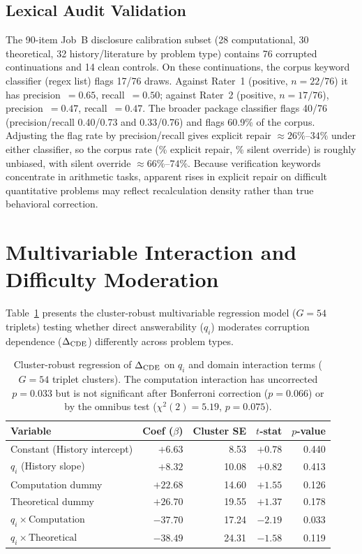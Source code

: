 

\subsection*{Lexical Audit Validation}
\label{app:lexical_audit}

The 90-item Job~B disclosure calibration subset (28 computational, 30 theoretical, 32 history/literature by problem type) contains 76 corrupted continuations and 14 clean controls. On these continuations, the corpus keyword classifier (regex list) flags 17/76 draws. Against Rater~1 (positive, $n=22/76$) it has precision~$=0.65$, recall~$=0.50$; against Rater~2 (positive, $n=17/76$), precision~$=0.47$, recall~$=0.47$. The broader package classifier flags 40/76 (precision/recall 0.40/0.73 and 0.33/0.76) and flags 60.9\% of the corpus. Adjusting the flag rate by precision/recall gives explicit repair $\approx 26\%$--$34\%$ under either classifier, so the corpus rate (\GoldExplicitRepairPct\% explicit repair, \GoldSilentOverridePct\% silent override) is roughly unbiased, with silent override $\approx 66\%$--$74\%$. Because verification keywords concentrate in arithmetic tasks, apparent rises in explicit repair on difficult quantitative problems may reflect recalculation density rather than true behavioral correction.



\section{Multivariable Interaction and Difficulty Moderation}
\label{app:interaction}

Table~\ref{tab:interaction_regression} presents the cluster-robust multivariable regression model ($G=54$ triplets) testing whether direct answerability ($q_i$) moderates corruption dependence ($\Delta_{\mathrm{CDE}}$) differently across problem types.

\begin{table}[t]\small
\centering
\begin{tabular}{@{}lrrrr@{}}
\toprule
Variable & Coef ($\beta$) & Cluster SE & $t$-stat & $p$-value \\
\midrule
Constant (History intercept) & $+6.63$ & 8.53 & $+0.78$ & 0.440 \\
$q_i$ (History slope) & $+8.32$ & 10.08 & $+0.82$ & 0.413 \\
Computation dummy & $+22.68$ & 14.60 & $+1.55$ & 0.126 \\
Theoretical dummy & $+26.70$ & 19.55 & $+1.37$ & 0.178 \\
$q_i \times \text{Computation}$ & $-37.70$ & 17.24 & $-2.19$ & 0.033 \\
$q_i \times \text{Theoretical}$ & $-38.49$ & 24.31 & $-1.58$ & 0.119 \\
\bottomrule
\end{tabular}
\caption{Cluster-robust regression of $\Delta_{\mathrm{CDE}}$ on $q_i$ and domain interaction terms ($G=54$ triplet clusters). The computation interaction has uncorrected $p = 0.033$ but is not significant after Bonferroni correction ($p = 0.066$) or by the omnibus test ($\chi^2(2)=5.19$, $p = 0.075$).}
\label{tab:interaction_regression}
\end{table}

